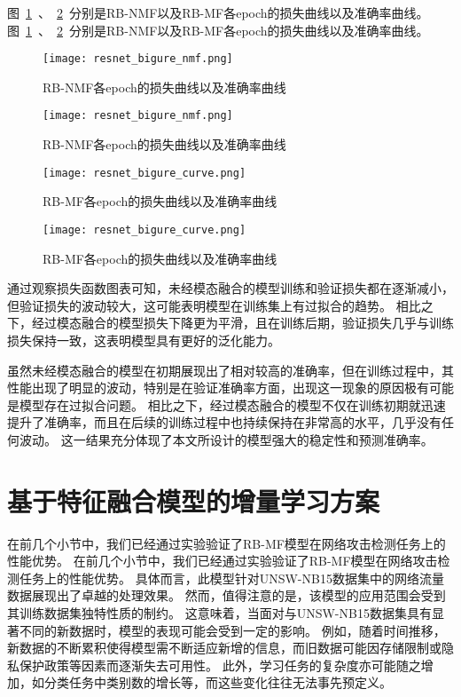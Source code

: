 图~\ref{fig:ResNet-BiGRU-NoFusion-loss}~、~\ref{fig:ResNet-BiGRU-Fusion-loss}~分别是RB-NMF以及RB-MF各epoch的损失曲线以及准确率曲线。
图~\ref{fig:ResNet-BiGRU-NoFusion-loss}~、~\ref{fig:ResNet-BiGRU-Fusion-loss}~分别是RB-NMF以及RB-MF各epoch的损失曲线以及准确率曲线。
\begin{figure}[htbp]
	\centering
	\texttt{[image: resnet\_bigure\_nmf.png]}
	\caption{RB-NMF各epoch的损失曲线以及准确率曲线}
	\texttt{[image: resnet\_bigure\_nmf.png]}
	\caption{RB-NMF各epoch的损失曲线以及准确率曲线}
	\label{fig:ResNet-BiGRU-NoFusion-loss}
\end{figure}
\begin{figure}[htbp]
	\centering
	\texttt{[image: resnet\_bigure\_curve.png]}
	\caption{RB-MF各epoch的损失曲线以及准确率曲线}
	\texttt{[image: resnet\_bigure\_curve.png]}
	\caption{RB-MF各epoch的损失曲线以及准确率曲线}
	\label{fig:ResNet-BiGRU-Fusion-loss}
\end{figure}
通过观察损失函数图表可知，未经模态融合的模型训练和验证损失都在逐渐减小，但验证损失的波动较大，这可能表明模型在训练集上有过拟合的趋势。
相比之下，经过模态融合的模型损失下降更为平滑，且在训练后期，验证损失几乎与训练损失保持一致，这表明模型具有更好的泛化能力。\par
虽然未经模态融合的模型在初期展现出了相对较高的准确率，但在训练过程中，其性能出现了明显的波动，特别是在验证准确率方面，出现这一现象的原因极有可能是模型存在过拟合问题。
相比之下，经过模态融合的模型不仅在训练初期就迅速提升了准确率，而且在后续的训练过程中也持续保持在非常高的水平，几乎没有任何波动。
这一结果充分体现了本文所设计的模型强大的稳定性和预测准确率。\par

\section{基于特征融合模型的增量学习方案}
在前几个小节中，我们已经通过实验验证了RB-MF模型在网络攻击检测任务上的性能优势。
在前几个小节中，我们已经通过实验验证了RB-MF模型在网络攻击检测任务上的性能优势。
具体而言，此模型针对UNSW-NB15数据集中的网络流量数据展现出了卓越的处理效果。
然而，值得注意的是，该模型的应用范围会受到其训练数据集独特性质的制约。
这意味着，当面对与UNSW-NB15数据集具有显著不同的新数据时，模型的表现可能会受到一定的影响。
例如，随着时间推移，新数据的不断累积使得模型需不断适应新增的信息，而旧数据可能因存储限制或隐私保护政策等因素而逐渐失去可用性。
此外，学习任务的复杂度亦可能随之增加，如分类任务中类别数的增长等，而这些变化往往无法事先预定义。\par

